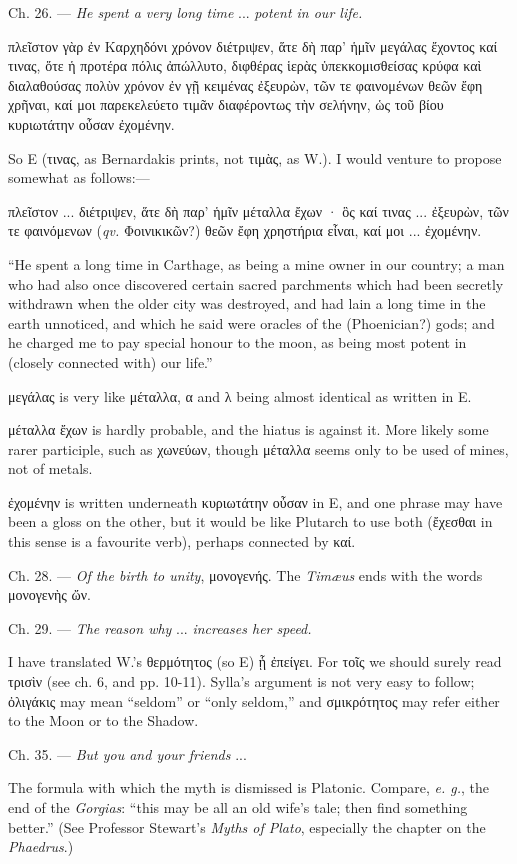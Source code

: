 \documentclass[a4paper, 11pt, oneside, polutonikogreek, english]{article}
\begin{document}
Ch. 26. --- \emph{He spent a very long time} ... \emph{potent in our life.}

πλεῖστον γὰρ ἐν Καρχηδόνι χρόνον διέτριψεν, ἅτε δὴ παρ' ἡμῖν μεγάλας ἔχοντος καί τινας, ὅτε ἡ προτέρα πόλις ἀπώλλυτο, διφθέρας ἱερὰς ὑπεκκομισθείσας κρύφα καὶ διαλαθούσας πολὺν χρόνον ἐν γῇ κειμένας ἐξευρὼν, τῶν τε φαινομένων θεῶν ἔφη χρῆναι, καί μοι παρεκελεύετο τιμᾶν διαφέροντως τὴν σελήνην, ὡς τοῦ βίου κυριωτάτην οὖσαν ἐχομένην.

So E (τινας, as Bernardakis prints, not τιμὰς, as W.). I would venture to propose somewhat as follows:---

πλεῖστον ... διέτριψεν, ἅτε δὴ παρ' ἡμῖν μέταλλα ἔχων · ὃς καί τινας ... ἐξευρὼν, τῶν τε φαινόμενων (\emph{qv.} Φοινικικῶν?) θεῶν ἔφη χρηστήρια εἶναι, καί μοι ... ἐχομένην.

``He spent a long time in Carthage, as being a mine owner in our country; a man who had also once discovered certain sacred parchments which had been secretly withdrawn when the older city was destroyed, and had lain a long time in the earth unnoticed, and which he said were oracles of the (Phoenician?) gods; and he charged me to pay special honour to the moon, as being most potent in (closely connected with) our life.''

μεγάλας is very like μέταλλα, α and λ being almost identical as written in E.

μέταλλα ἔχων is hardly probable, and the hiatus is against it. More likely some rarer participle, such as χωνεύων, though μέταλλα seems only to be used of mines, not of metals.

ἐχομένην is written underneath κυριωτάτην οὖσαν in E, and one phrase may have been a gloss on the other, but it would be like Plutarch to use both (ἔχεσθαι in this sense is a favourite verb), perhaps connected by καί.

Ch. 28. --- \emph{Of the birth to unity}, μονογενής. The \emph{Timæus} ends with the words μονογενὴς ὤν.

Ch. 29. --- \emph{The reason why} ... \emph{increases her speed.}

I have translated W.'s θερμότητος (so E) ᾗ ἐπείγει. For τοῖς we should surely read τρισὶν (see ch. 6, and pp. 10-11). Sylla's argument is not very easy to follow; ὀλιγάκις may mean ``seldom'' or ``only seldom,'' and σμικρότητος may refer either to the Moon or to the Shadow.

Ch. 35. --- \emph{But you and your friends} ...

The formula with which the myth is dismissed is Platonic. Compare, \emph{e. g.}, the end of the \emph{Gorgias}: ``this may be all an old wife's tale; then find something better.'' (See Professor Stewart's \emph{Myths of Plato}, especially the chapter on the \emph{Phaedrus}.)
\clearpage
\end{document}
